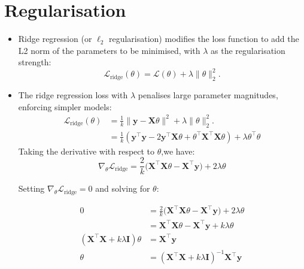\section{Regularisation}


\begin{itemize}
    \item Ridge regression (or $\ell_2$ regularisation) modifies the loss function to add the L2 norm of the parameters to be minimised, with $\lambda$ as the regularisation strength:
          \[
              \mathcal{L}_{\text{ridge}}(\theta) = \mathcal{L}(\theta) + \lambda \|\theta\|_2^2.
          \]
    \item The ridge regression loss with $\lambda$ penalises large parameter magnitudes, enforcing simpler models:
          \begin{align*}
              \mathcal{L}_{\text{ridge}}(\theta) & = \frac{1}{k} \|\mathbf{y} - \mathbf{X}\theta\|^2 + \lambda \|\theta\|_2^2.                                                                              \\
                                                 & =\frac{1}{k}(\mathbf{y}^\top\mathbf{y}-2\mathbf{y}^\top\boldsymbol{X}\theta+\theta^\top\boldsymbol{X}^\top\boldsymbol{X}\theta)+\lambda\theta^\top\theta
          \end{align*}
          Taking the derivative with respect to $\theta$,we have:
          $$\nabla_\theta\mathcal{L}_{\mathrm{ridge}}=\frac{2}{k}\bigg(\boldsymbol{X}^\top\boldsymbol{X}\theta-\boldsymbol{X}^\top\mathbf{y}\bigg)+2\lambda\theta $$


          Setting $\nabla_\theta\mathcal{L}_\mathrm{ridge}=0$ and solving for $\theta:$

          $$\begin{aligned}0&=\frac{2}{k}\bigg(\boldsymbol{X}^{\top}\boldsymbol{X}\theta-\boldsymbol{X}^{\top}\mathbf{y}\bigg)+2\lambda\theta\\&=\boldsymbol{X}^{\top}\boldsymbol{X}\theta-\boldsymbol{X}^{\top}\mathbf{y}+k\lambda\theta\\(\boldsymbol{X}^{\top}\boldsymbol{X}+k\lambda\mathbf{I})\theta&=\boldsymbol{X}^{\top}\mathbf{y}\\\theta&=(\boldsymbol{X}^{\top}\boldsymbol{X}+k\lambda\mathbf{I})^{-1}\boldsymbol{X}^{\top}\mathbf{y}\end{aligned}$$
\end{itemize}

